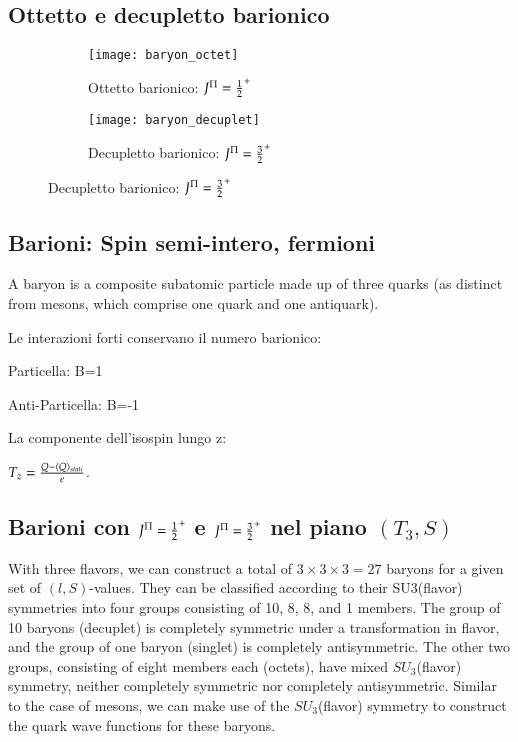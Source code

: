 \documentclass[main.tex]{subfiles}
\begin{document}
\subsection{Ottetto e decupletto barionico}

\begin{figure}
    \centering
    \begin{subfigure}[b]{0.45\textwidth}
    \centering
        \texttt{[image: baryon\_octet]}
\caption{Ottetto barionico: $J^{\Pi}=\frac{1}{2}^+$}
\label{fig:baryoctet}
    \end{subfigure}
    \hfill
    \begin{subfigure}[b]{0.45\textwidth}
    \centering
        \texttt{[image: baryon\_decuplet]}
\caption{Decupletto barionico: $J^{\Pi}=\frac{3}{2}^+$}
        \label{fig:barydecuplet}
    \end{subfigure}
   
\end{figure}

\clearpage



\subsection{ Barioni: Spin semi-intero, fermioni}

A baryon is a composite subatomic particle made up of three quarks (as distinct from mesons, which comprise one quark and one antiquark).

Le interazioni forti conservano il numero barionico:
\begin{itemize*}
\item Particella: B=1
\item Anti-Particella: B=-1
\end{itemize*}

La componente dell'isospin lungo z:

$T_z=\frac{Q-\langle Q \rangle_{stati}}{e}$.

\subsection{Barioni con $J^{\Pi}=\frac{1}{2}^+$ e $J^{\Pi}=\frac{3}{2}^+$ nel piano $(T_3,S)$}


With three flavors, we can construct a total of $3\times3\times3=27$ baryons for a given set of $(l,S)$-values. They can be classified according to their SU3(flavor) symmetries into four groups consisting of 10, 8, 8, and 1 members. The group of 10 baryons (decuplet) is completely symmetric under a transformation in flavor, and the group of one baryon (singlet) is completely antisymmetric. The other two groups, consisting of eight members each (octets), have mixed $SU_3$(flavor) symmetry, neither completely symmetric nor completely antisymmetric. Similar to the case of mesons, we can make use of the $SU_3$(flavor) symmetry to construct the quark wave functions for these baryons.
\end{document}
